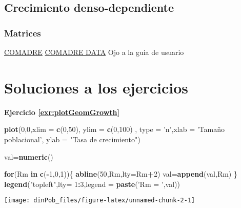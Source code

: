 \documentclass[12pt,letterpaper,]{book}
\newenvironment{Shaded}{\begin{snugshade}}{\end{snugshade}}
\newcommand{\KeywordTok}[1]{\textcolor[rgb]{0.13,0.29,0.53}{\textbf{#1}}}
\newcommand{\DataTypeTok}[1]{\textcolor[rgb]{0.13,0.29,0.53}{#1}}
\newcommand{\DecValTok}[1]{\textcolor[rgb]{0.00,0.00,0.81}{#1}}
\newcommand{\StringTok}[1]{\textcolor[rgb]{0.31,0.60,0.02}{#1}}
\newcommand{\ControlFlowTok}[1]{\textcolor[rgb]{0.13,0.29,0.53}{\textbf{#1}}}
\newcommand{\OperatorTok}[1]{\textcolor[rgb]{0.81,0.36,0.00}{\textbf{#1}}}
\newcommand{\NormalTok}[1]{#1}
\begin{document}
\section{Crecimiento
denso-dependiente}\label{crecimiento-denso-dependiente}

\subsection{Matrices}\label{matrices}

\href{http://onlinelibrary.wiley.com/doi/10.1111/1365-2656.12482/full}{COMADRE}
\href{http://www.compadre-db.org/Data/Comadre}{COMADRE DATA} Ojo a la
guia de usuario

\chapter{Soluciones a los ejercicios}\label{soluciones-a-los-ejercicios}

\textbf{Ejercicio \ref{exr:plotGeomGrowth}}

\begin{Shaded}
\begin{Highlighting}[]
\KeywordTok{plot}\NormalTok{(}\DecValTok{0}\NormalTok{,}\DecValTok{0}\NormalTok{,}\DataTypeTok{xlim =} \KeywordTok{c}\NormalTok{(}\DecValTok{0}\NormalTok{,}\DecValTok{50}\NormalTok{),}
     \DataTypeTok{ylim =} \KeywordTok{c}\NormalTok{(}\DecValTok{0}\NormalTok{,}\DecValTok{100}\NormalTok{) ,}
     \DataTypeTok{type =} \StringTok{'n'}\NormalTok{,}\DataTypeTok{xlab =} \StringTok{'Tamaño poblacional'}\NormalTok{,}
     \DataTypeTok{ylab =} \StringTok{"Tasa de crecimiento"}\NormalTok{)}

\NormalTok{val=}\KeywordTok{numeric}\NormalTok{()}

\ControlFlowTok{for}\NormalTok{(Rm }\ControlFlowTok{in} \KeywordTok{c}\NormalTok{(}\OperatorTok{-}\DecValTok{1}\NormalTok{,}\DecValTok{0}\NormalTok{,}\DecValTok{1}\NormalTok{))\{}
  \KeywordTok{abline}\NormalTok{(}\DecValTok{50}\NormalTok{,Rm,}\DataTypeTok{lty=}\NormalTok{Rm}\OperatorTok{+}\DecValTok{2}\NormalTok{)}
\NormalTok{  val=}\KeywordTok{append}\NormalTok{(val,Rm)}
\NormalTok{\}}
\KeywordTok{legend}\NormalTok{(}\StringTok{"topleft"}\NormalTok{,}\DataTypeTok{lty=} \DecValTok{1}\OperatorTok{:}\DecValTok{3}\NormalTok{,}\DataTypeTok{legend =} \KeywordTok{paste}\NormalTok{(}\StringTok{'Rm = '}\NormalTok{,val))}
\end{Highlighting}
\end{Shaded}

\begin{center}\texttt{[image: dinPob\_files/figure-latex/unnamed-chunk-2-1]} \end{center}
\end{document}

